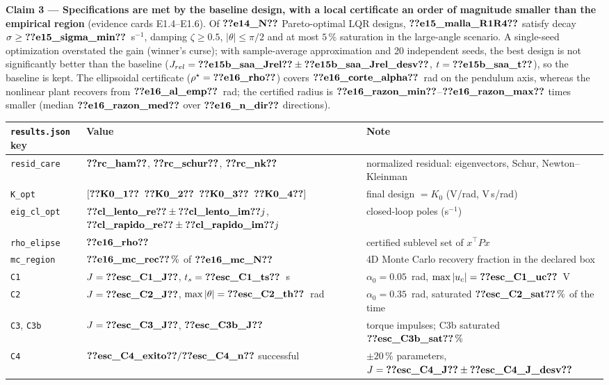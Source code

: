 \documentclass[10pt,a4paper]{article}
\begin{document}
\textbf{Claim 3 --- Specifications are met by the baseline design, with a local certificate an order of magnitude
smaller than the empirical region} (evidence cards E1.4--E1.6). Of $\V{e14_N}$ Pareto-optimal LQR designs,
$\V{e15_malla_R1R4}$ satisfy decay $\sigma\ge\V{e15_sigma_min}$~s$^{-1}$, damping $\zeta\ge0.5$, $|\theta|\le\pi/2$ and at most
$5\,\%$ saturation in the large-angle scenario. A single-seed optimization overstated the gain
(winner's curse); with sample-average approximation and 20 independent seeds, the best design is not
significantly better than the baseline ($J_{rel}=\V{e15b_saa_Jrel}\pm\V{e15b_saa_Jrel_desv}$, $t=\V{e15b_saa_t}$), so the
baseline is kept. The ellipsoidal certificate ($\rho^\star=\V{e16_rho}$) covers $\V{e16_corte_alpha}$~rad on the pendulum
axis, whereas the nonlinear plant recovers from $\V{e16_al_emp}$~rad; the certified radius is $\V{e16_razon_min}$--$\V{e16_razon_max}$
times smaller (median $\V{e16_razon_med}$ over $\V{e16_n_dir}$ directions).

\begin{center}\small
\begin{tabular}{@{}l l l@{}}
\toprule
\texttt{results.json} key & Value & Note \\
\midrule
\texttt{resid\_care} & $\V{rc_ham}$, $\V{rc_schur}$, $\V{rc_nk}$ & normalized residual: eigenvectors, Schur, Newton--Kleinman \\
\texttt{K\_opt} & $[\V{K0_1}\;\;\V{K0_2}\;\;\V{K0_3}\;\;\V{K0_4}]$ & final design $=K_0$ (V/rad, V\,s/rad) \\
\texttt{eig\_cl\_opt} & $\V{cl_lento_re}\pm\V{cl_lento_im}j$, $\V{cl_rapido_re}\pm\V{cl_rapido_im}j$ & closed-loop poles (s$^{-1}$) \\
\texttt{rho\_elipse} & $\V{e16_rho}$ & certified sublevel set of $x^\top Px$ \\
\texttt{mc\_region} & $\V{e16_mc_rec}\,\%$ of $\V{e16_mc_N}$ & 4D Monte Carlo recovery fraction in the declared box \\
\texttt{C1} & $J=\V{esc_C1_J}$, $t_s=\V{esc_C1_ts}$~s & $\alpha_0=0.05$~rad, $\max|u_c|=\V{esc_C1_uc}$~V \\
\texttt{C2} & $J=\V{esc_C2_J}$, $\max|\theta|=\V{esc_C2_th}$~rad & $\alpha_0=0.35$~rad, saturated $\V{esc_C2_sat}\,\%$ of the time \\
\texttt{C3}, \texttt{C3b} & $J=\V{esc_C3_J}$, $\V{esc_C3b_J}$ & torque impulses; C3b saturated $\V{esc_C3b_sat}\,\%$ \\
\texttt{C4} & $\V{esc_C4_exito}/\V{esc_C4_n}$ successful & $\pm20\,\%$ parameters, $J=\V{esc_C4_J}\pm\V{esc_C4_J_desv}$ \\
\bottomrule
\end{tabular}
\end{center}
\end{document}
